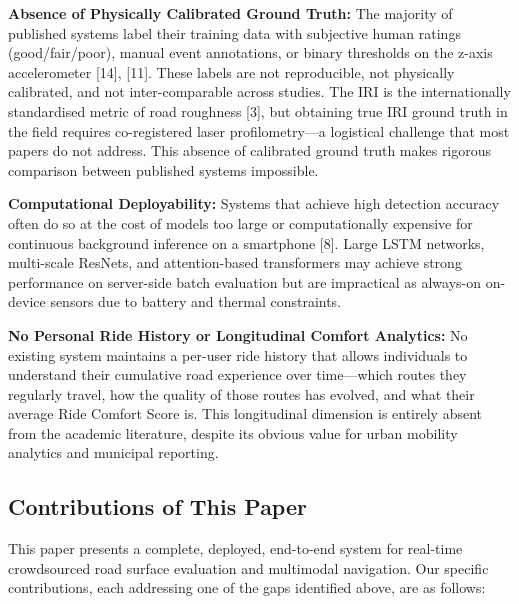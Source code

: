\documentclass[conference]{IEEEtran}
\begin{document}
\textbf{Absence of Physically Calibrated Ground Truth:} The majority of published systems label their training data with subjective human ratings (good/fair/poor), manual event annotations, or binary thresholds on the z-axis accelerometer [14], [11].
These labels are not reproducible, not physically calibrated, and not inter-comparable across studies.
The IRI is the internationally standardised metric of road roughness [3], but obtaining true IRI ground truth in the field requires co-registered laser profilometry---a logistical challenge that most papers do not address.
This absence of calibrated ground truth makes rigorous comparison between published systems impossible.

\textbf{Computational Deployability:} Systems that achieve high detection accuracy often do so at the cost of models too large or computationally expensive for continuous background inference on a smartphone [8].
Large LSTM networks, multi-scale ResNets, and attention-based transformers may achieve strong performance on server-side batch evaluation but are impractical as always-on on-device sensors due to battery and thermal constraints.

\textbf{No Personal Ride History or Longitudinal Comfort Analytics:} No existing system maintains a per-user ride history that allows individuals to understand their cumulative road experience over time---which routes they regularly travel, how the quality of those routes has evolved, and what their average Ride Comfort Score is.
This longitudinal dimension is entirely absent from the academic literature, despite its obvious value for urban mobility analytics and municipal reporting.

\subsection{Contributions of This Paper}
This paper presents a complete, deployed, end-to-end system for real-time crowdsourced road surface evaluation and multimodal navigation.
Our specific contributions, each addressing one of the gaps identified above, are as follows:
\end{document}
